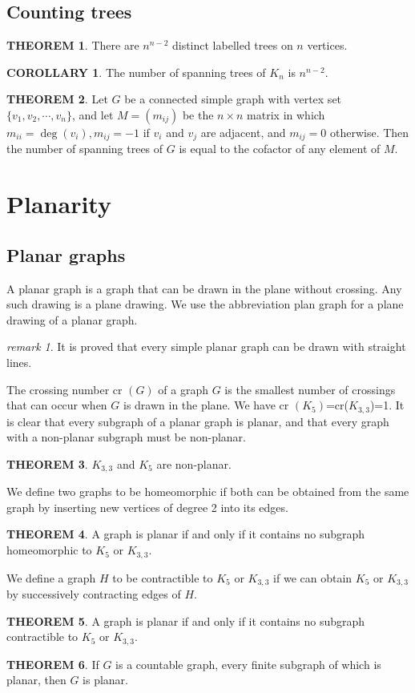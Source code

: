 \documentclass[a4paper,11pt]{article}%
\theoremstyle{remark}
\newtheorem*{remark}{remark}
\theoremstyle{definition}
\newtheorem{theorem}{THEOREM}[section]
\theoremstyle{definition}
\newtheorem{corollary}{COROLLARY}[section]
\theoremstyle{definition}
\theoremstyle{definition}
\theoremstyle{plain}
\theoremstyle{definition}
\begin{document}
\subsection{Counting trees}
\begin{theorem}
    There are $n^{n-2}$ distinct labelled trees on $n$ vertices.
\end{theorem}
\begin{corollary}
    The number of spanning trees of $K_n$ is $n^{n-2}$.
\end{corollary}
\begin{theorem}
    Let $G$ be a connected simple graph with vertex set $\{v_1,v_2,\cdots,v_n\}$,
    and let $M=(m _{ij})$ be the $n\times n$ matrix in which $m_{ii}=\deg(v_i),m _{ij}=-1$
    if $v_i$ and $v_j$ are adjacent, and $m _{ij}=0$ otherwise. Then 
    the number of spanning trees of $G$ is equal to the cofactor of any element
    of $M$.
\end{theorem}
\section{Planarity}
\subsection{Planar graphs}
A planar graph is a graph that can be drawn in the plane without crossing. Any such drawing is a plane drawing. We use the abbreviation 
plan graph for a plane drawing of a planar graph. 
\begin{remark}
    It is proved that every simple planar graph can be drawn with straight lines.
\end{remark}
The crossing number cr $(G)$ of a graph $G$ is the smallest number of crossings that can occur when $G$ is drawn in the plane.
We have cr $(K_5)$=cr($K_{3,3}$)=1.
It is clear that every subgraph of a planar graph is planar, and that every graph with a non-planar subgraph must be non-planar.
\begin{theorem}
    $K_{3,3}$ and $K_5$ are non-planar.
\end{theorem}
We define two graphs to be homeomorphic if both can be obtained from the same graph by inserting new vertices of degree 2 into its edges.
\begin{theorem}
    A graph is planar if and only if it contains no subgraph homeomorphic to $K_5$ or $K_{3,3}$.
\end{theorem}
We define a graph $H$ to be contractible to $K_5$ or $K_{3,3}$ if we can obtain $K_5$ or $K_{3,3}$ by successively contracting edges of $H$.
\begin{theorem}
    A graph is planar if and only if it contains no subgraph contractible to $K_5$ or $K_{3,3}$.
\end{theorem}
\begin{theorem}
    If $G$ is a countable graph, every finite subgraph of which is planar, then $G$ is planar.
\end{theorem}
\end{document}

